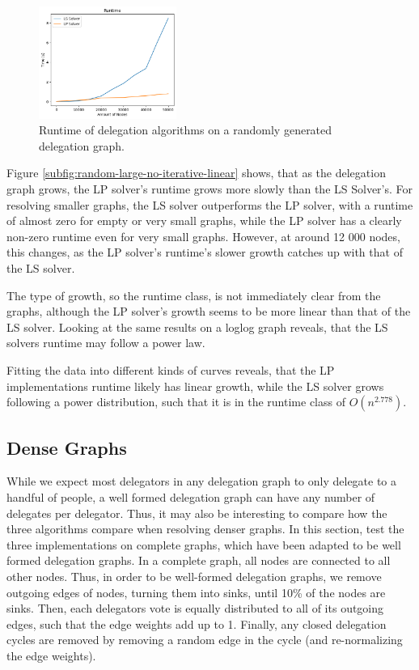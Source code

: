 \begin{figure}[h]
    \centering
    \includegraphics[width=0.4\textwidth]{0-50000_random_no_iterative}
    \caption{Runtime of delegation algorithms on a randomly generated delegation graph.}
    \label{fig:random-large-no-iterative}
\end{figure}


Figure \ref{subfig:random-large-no-iterative-linear} shows, that as the delegation graph grows, the LP solver's runtime grows more slowly than the LS Solver's. For resolving smaller graphs, the LS solver outperforms the LP solver, with a runtime of almost zero for empty or very small graphs, while the LP solver has a clearly non-zero runtime even for very small graphs. However, at around 12 000 nodes, this changes, as the LP solver's runtime's slower growth catches up with that of the LS solver. 

The type of growth, so the runtime class, is not immediately clear from the graphs, although the LP solver's growth seems to be more linear than that of the LS solver. Looking at the same results on a loglog graph reveals, that the LS solvers runtime may follow a power law.

Fitting the data into different kinds of curves reveals, that the LP implementations runtime likely has linear growth, while the LS solver grows following a power distribution, such that it is in the runtime class of $O(n^{2.778})$.


\subsection{Dense Graphs}

While we expect most delegators in any delegation graph to only delegate to a handful of people, a well formed delegation graph can have any number of delegates per delegator. Thus, it may also be interesting to compare how the three algorithms compare when resolving denser graphs. In this section, test the three implementations on complete graphs, which have been adapted to be well formed delegation graphs. In a complete graph, all nodes are connected to all other nodes. Thus, in order to be well-formed delegation graphs, we remove outgoing edges of nodes, turning them into sinks, until 10\% of the nodes are sinks. Then, each delegators vote is equally distributed to all of its outgoing edges, such that the edge weights add up to 1. Finally, any closed delegation cycles are removed by removing a random edge in the cycle (and re-normalizing the edge weights). 

